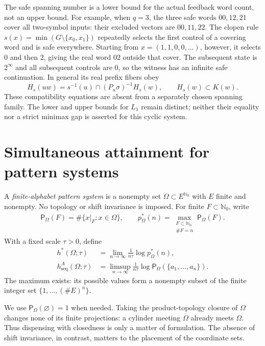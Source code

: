 \documentclass[11pt,reqno]{amsart}
\numberwithin{equation}{section}
\theoremstyle{definition}
\newcommand{\Nzero}{\mathbb N_0}
\newcommand{\Patt}{\mathsf P}
\newcommand{\hseq}{h_{\mathrm{seq}}}
\newcommand{\hpat}{h^{*}}
\begin{document}
The safe spanning number is a lower bound for the actual feedback
word count, not an upper bound. For example, when $q=3$, the
three safe words $00,12,21$ cover all two-symbol inputs: their
excluded vectors are $00,11,22$. The clopen rule
$s(x)=\min(G\setminus\{x_0,x_1\})$ repeatedly selects the
first control of a covering word and is safe everywhere.
Starting from $x=(1,1,0,0,\ldots)$, however, it selects $0$
and then $2$, giving the real word $02$ outside that cover.
The subsequent state is $2^\infty$ and all subsequent controls
are $0$, so the witness has an infinite safe continuation.
In general its real prefix fibers obey
\[
 H_s(uw)=s^{-1}(u)\cap(P_u\sigma)^{-1}H_s(w),
 \qquad H_s(w)\subset K(w).
\]
These compatibility equations are absent from a separately
chosen spanning family. The lower and upper bounds for $L_1$
remain distinct; neither their equality nor a strict minimax
gap is asserted for this cyclic system.


\section{Simultaneous attainment for pattern systems}\label{sec:comb}

A \emph{finite-alphabet pattern system} is a nonempty set
$\Omega\subset E^{\Nzero}$ with $E$ finite and nonempty.  No topology or
shift invariance is imposed.  For finite $F\subset\Nzero$, write
\begin{align*}
 \Patt_\Omega(F)=\#\{x|_F:x\in\Omega\},
 \qquad
 p_\Omega^*(n)=
 \max_{\substack{F\subset\Nzero\\\#F=n}}\Patt_\Omega(F).
\end{align*}
With a fixed scale $\tau>0$, define
\begin{align*}
 \hpat(\Omega;\tau)&=\lim_{n\to\infty}
       \frac1{n\tau}\log p_\Omega^*(n),\\
 \hseq^A(\Omega;\tau)&=\limsup_{n\to\infty}
       \frac1{n\tau}\log
       \Patt_\Omega(\{a_1,\ldots,a_n\}).
\end{align*}
The maximum exists: its possible values form a nonempty subset of the finite
integer set $\{1,\ldots,(\#E)^n\}$.

We use $\Patt_\Omega(\varnothing)=1$ when needed.
Taking the product-topology closure of $\Omega$ changes none of its
finite projections: a cylinder meeting $\overline\Omega$ already meets
$\Omega$. Thus dispensing with closedness is only a matter of
formulation. The absence of shift invariance, in contrast, matters to the
placement of the coordinate sets.
\end{document}
